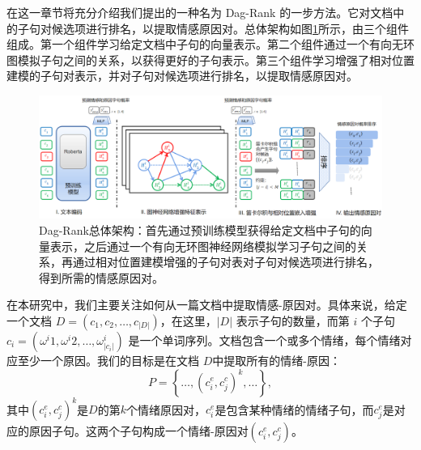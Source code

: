 



在这一章节将充分介绍我们提出的一种名为 Dag-Rank 的一步方法。它对文档中的子句对候选项进行排名，以提取情感原因对。总体架构如图\ref{fig:general}所示，由三个组件组成。第一个组件学习给定文档中子句的向量表示。第二个组件通过一个有向无环图模拟子句之间的关系，以获得更好的子句表示。第三个组件学习增强了相对位置建模的子句对表示，并对子句对候选项进行排名，以提取情感原因对。

\begin{figure}[ht]
    \vspace{20pt}
	\centering
    \includegraphics[width=1.02\linewidth]{figures/arch.png}
    \vspace{8pt}
	\caption{Dag-Rank总体架构：首先通过预训练模型获得给定文档中子句的向量表示，之后通过一个有向无环图神经网络模拟学习子句之间的关系，再通过相对位置建模增强的子句对表对子句对候选项进行排名，得到所需的情感原因对。}
    \label{fig:general}
    \vspace{7pt}
\end{figure}

    

在本研究中，我们主要关注如何从一篇文档中提取情感-原因对。具体来说，给定一个文档 $D=(c_{1},c_{2},\dots,c_{|D|})$，在这里，$|D|$ 表示子句的数量，而第 $i$ 个子句 $c_{i}=(\omega^{i}{1},\omega^{i}{2},\dots,\omega^{i}_{|c_{i}|})$ 是一个单词序列。文档包含一个或多个情绪，每个情绪对应至少一个原因。我们的目标是在文档 $D$中提取所有的情绪-原因：
\vspace{3pt}  \begin{equation}
  P=\left\{\dots,(c_{i}^{e},c_{j}^{c})^k,\dots \right\},
  \label{eqn1}
\end{equation} \vspace{4pt}
其中$(c_{i}^{e},c_{j}^{c})^k$是$D$的第$k$个情绪原因对，$c_{i}^{e}$是包含某种情绪的情绪子句，而$c_{j}^{e}$是对应的原因子句。这两个子句构成一个情绪-原因对$(c_{i}^{e},c_{j}^{c})$。


